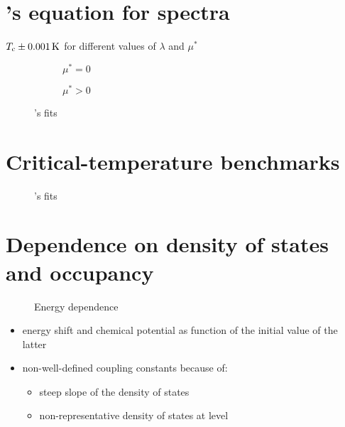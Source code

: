 \section{'s equation for  spectra}

\begin{table}
    \centering
    
    \caption{$T \sb{\text{c}} \pm 0.001\,\mathrm K$ for different values of $\lambda$ and
             $\mu^*$}
\end{table}

\begin{figure}
    \small
    \begin{subfigure}{7cm}
        
        \caption{$\mu^* = 0$}
    \end{subfigure}%
    \begin{subfigure}{7cm}
        
        \caption{$\mu^* > 0$}
    \end{subfigure}
    \caption{'s fits}
\end{figure}

\section{Critical-temperature benchmarks}

\begin{figure}
    \small
    
    
    
    
    \caption{'s fits}
\end{figure}

\section{Dependence on density of states and occupancy}

\begin{figure}
    \small
    \centering
    
    
    
    \caption{Energy dependence}
\end{figure}

\begin{itemize}
    \item energy shift and chemical potential as function of the initial value
          of the latter
    \item non-well-defined coupling constants because of:
    \begin{itemize}
        \item steep slope of the density of states
        \item non-representative density of states at  level
    \end{itemize}
\end{itemize}
